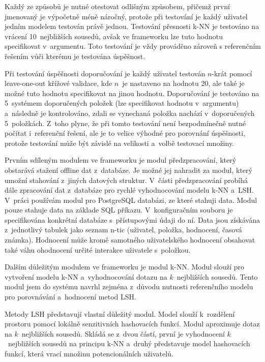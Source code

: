 \documentclass[11pt]{article}
\begin{document}
Každý ze způsobů je nutné otestovat odlišným způsobem, přičemž první jmenovaný je výpočetně méně náročný, protože při testování je každý uživatel jedním modelem testován právě jednou. Testování přesnosti k-NN je testováno na vrácení 10~nejbližších sousedů, avšak ve frameworku lze tuto hodnotu specifikovat v~argumentu. Toto testování je vždy prováděno zároveň s referenčním řešením vůči kterému je testována úspěšnost. 

Při testování úspěšnosti doporučování je každý uživatel testován $n$-krát pomocí leave-one-out křížové validace, kde $n$~je nastaveno na hodnotu 20, ale také je možné tuto hodnotu specifikovat na jinou hodnotu. Doporučování je testováno na 5~systémem doporučených položek (lze specifikovat hodnotu v~argumentu) a~následně je kontrolováno, zdali se vynechaná položka nachází v~doporučených 5~položkách. Z~toho plyne, že při tomto testování není bezpodmínečně nutné počítat i~referenční řešení, ale je to velice výhodné pro porovnání úspěšnosti, protože testování může být závislé na velikosti a~volbě testovací množiny.

Prvním sdíleným modulem ve frameworku je modul předzpracování, který obstarává stažení offline dat z~databáze. Je možné jej nahradit za modul, který umožní stahování z~jiných datových struktur. V~části předzpracování probíhá dále zpracování dat z~databáze pro rychlé vyhodnocování modelu k-NN a~LSH. V~práci používám modul pro PostgreSQL databázi, ze které stahuji data. Modul pouze stahuje data na základe SQL příkazu. V~konfiguračním souboru je specifikována konkrétní databáze s~přístupovými údaji do ní. Data jsou získávána z~jednotlivý tabulek jako seznam n-tic (uživatel, položka, hodnocení, časová známka). Hodnocení může kromě samotného uživatelského hodnocení obsahovat také váhu ohodnocení určité interakce uživatele s~položkou.

Dalším důležitým modulem ve frameworku je modul k-NN. Modul slouží pro vytvoření modelu k-NN a~vyhodnocování dotazu na $k$~nejbližších sousedů. Tento modul jsem do systému navrhl zejména z~důvodu nutnosti referenčního modelu pro porovnávání a~hodnocení metod LSH.

Metody LSH představují vlastní důležitý modul. Model slouží k~rozdělení
prostoru pomocí lokálně senzitivních hashovacích funkcí. Modul aproximuje dotaz na $k$~nejbližších sousedů. Skládá se z~dvou částí, první je vyhodnocení $k$~nejbližších sousedů na principu k-NN a~druhý představuje model hashovacích funkcí, která vrací množinu potencionálních uživatelů.
\end{document}
